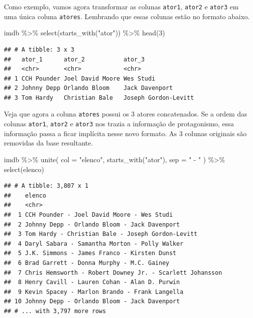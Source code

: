 \documentclass[
]{book}
\newenvironment{Shaded}{\begin{snugshade}}{\end{snugshade}}
\newcommand{\AttributeTok}[1]{\textcolor[rgb]{0.77,0.63,0.00}{#1}}
\newcommand{\DecValTok}[1]{\textcolor[rgb]{0.00,0.00,0.81}{#1}}
\newcommand{\FunctionTok}[1]{\textcolor[rgb]{0.00,0.00,0.00}{#1}}
\newcommand{\NormalTok}[1]{#1}
\newcommand{\SpecialCharTok}[1]{\textcolor[rgb]{0.00,0.00,0.00}{#1}}
\newcommand{\StringTok}[1]{\textcolor[rgb]{0.31,0.60,0.02}{#1}}
\begin{document}
Como exemplo, vamos agora transformar as colunas \texttt{ator1}, \texttt{ator2} e \texttt{ator3} em uma única coluna \texttt{atores}. Lembrando que essas colunas estão no formato abaixo.

\begin{Shaded}
\begin{Highlighting}[]
\NormalTok{imdb }\SpecialCharTok{\%\textgreater{}\%} \FunctionTok{select}\NormalTok{(}\FunctionTok{starts\_with}\NormalTok{(}\StringTok{"ator"}\NormalTok{)) }\SpecialCharTok{\%\textgreater{}\%} \FunctionTok{head}\NormalTok{(}\DecValTok{3}\NormalTok{)}
\end{Highlighting}
\end{Shaded}

\begin{verbatim}
## # A tibble: 3 x 3
##   ator_1      ator_2           ator_3              
##   <chr>       <chr>            <chr>               
## 1 CCH Pounder Joel David Moore Wes Studi           
## 2 Johnny Depp Orlando Bloom    Jack Davenport      
## 3 Tom Hardy   Christian Bale   Joseph Gordon-Levitt
\end{verbatim}

Veja que agora a coluna \texttt{atores} possui os 3 atores concatenados. Se a ordem das colunas \texttt{ator1}, \texttt{ator2} e \texttt{ator3} nos trazia a informação de protagonismo, essa informação passa a ficar implícita nesse novo formato. As 3 colunas originais são removidas da base resultante.

\begin{Shaded}
\begin{Highlighting}[]
\NormalTok{imdb }\SpecialCharTok{\%\textgreater{}\%} 
  \FunctionTok{unite}\NormalTok{(}
    \AttributeTok{col =} \StringTok{"elenco"}\NormalTok{,}
    \FunctionTok{starts\_with}\NormalTok{(}\StringTok{"ator"}\NormalTok{), }
    \AttributeTok{sep =} \StringTok{" {-} "}
\NormalTok{  ) }\SpecialCharTok{\%\textgreater{}\%} 
  \FunctionTok{select}\NormalTok{(elenco)}
\end{Highlighting}
\end{Shaded}

\begin{verbatim}
## # A tibble: 3,807 x 1
##    elenco                                                  
##    <chr>                                                   
##  1 CCH Pounder - Joel David Moore - Wes Studi              
##  2 Johnny Depp - Orlando Bloom - Jack Davenport            
##  3 Tom Hardy - Christian Bale - Joseph Gordon-Levitt       
##  4 Daryl Sabara - Samantha Morton - Polly Walker           
##  5 J.K. Simmons - James Franco - Kirsten Dunst             
##  6 Brad Garrett - Donna Murphy - M.C. Gainey               
##  7 Chris Hemsworth - Robert Downey Jr. - Scarlett Johansson
##  8 Henry Cavill - Lauren Cohan - Alan D. Purwin            
##  9 Kevin Spacey - Marlon Brando - Frank Langella           
## 10 Johnny Depp - Orlando Bloom - Jack Davenport            
## # ... with 3,797 more rows
\end{verbatim}
\end{document}
